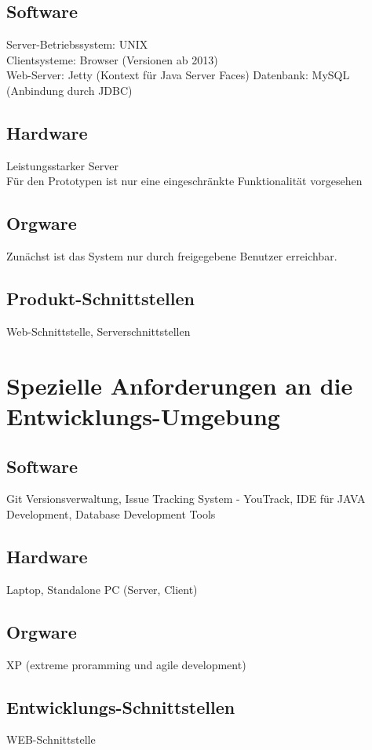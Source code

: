 		\subsection{Software}
		Server-Betriebssystem: UNIX\\
		Clientsysteme: Browser (Versionen ab 2013)\\
		Web-Server: Jetty (Kontext für Java Server Faces)
		Datenbank: MySQL (Anbindung durch JDBC)
		
		\subsection{Hardware}
		Leistungsstarker Server\\
		Für den Prototypen ist nur eine eingeschränkte Funktionalität vorgesehen
		
		\subsection{Orgware}
		
		Zunächst ist das System nur durch freigegebene Benutzer erreichbar. 		

		\subsection{Produkt-Schnittstellen}
		
		Web-Schnittstelle, Serverschnittstellen
		
	\section{Spezielle Anforderungen an die Entwicklungs-Umgebung}
		\subsection{Software}
		Git Versionsverwaltung, Issue Tracking System - YouTrack, IDE für JAVA Development, Database Development Tools
		
		\subsection{Hardware}
		Laptop, Standalone PC (Server, Client)
		\subsection{Orgware}
		XP (extreme proramming und agile development)	
		\subsection{Entwicklungs-Schnittstellen}
		WEB-Schnittstelle
		

